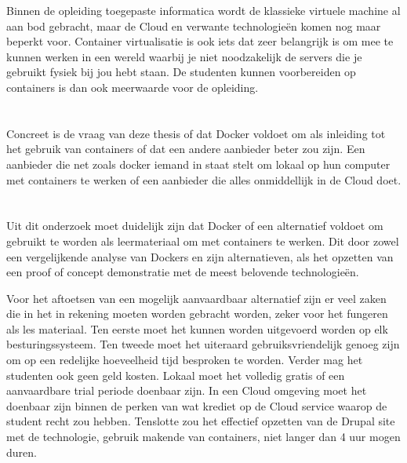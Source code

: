 Binnen de opleiding toegepaste informatica wordt de klassieke virtuele machine al aan bod gebracht, maar de Cloud en verwante technologieën komen nog maar beperkt voor. Container virtualisatie is ook  iets dat zeer belangrijk is om mee te kunnen werken in een wereld waarbij je niet noodzakelijk de servers die je gebruikt fysiek bij jou hebt staan. De studenten kunnen voorbereiden op containers is dan ook meerwaarde voor de opleiding.

\section{}
\label{sec:onderzoeksvraag}

Concreet is de vraag van deze thesis of dat Docker voldoet om als inleiding tot het gebruik van containers of dat een andere aanbieder beter zou zijn. Een aanbieder die net zoals docker iemand in staat stelt om lokaal op hun computer met containers te werken of een aanbieder die alles onmiddellijk  in de Cloud doet.

\section{}
\label{sec:onderzoeksdoelstelling}

Uit dit onderzoek moet duidelijk zijn dat Docker of een alternatief voldoet om gebruikt te worden als leermateriaal om met containers te werken. Dit door zowel een vergelijkende analyse van Dockers en zijn alternatieven, als het opzetten van een proof of concept demonstratie met de meest belovende technologieën.

Voor het aftoetsen van een mogelijk aanvaardbaar alternatief zijn er veel zaken die in het in rekening moeten worden gebracht worden, zeker voor het fungeren als les materiaal. Ten eerste moet het kunnen worden uitgevoerd worden op elk besturingssysteem. Ten tweede moet het uiteraard gebruiksvriendelijk genoeg zijn om op een redelijke hoeveelheid tijd besproken te worden.  Verder mag het studenten ook geen geld kosten. Lokaal moet het volledig gratis of een aanvaardbare trial periode doenbaar zijn. In een Cloud omgeving moet het doenbaar zijn binnen de perken van wat krediet op de Cloud service waarop de student recht zou hebben. Tenslotte zou het effectief opzetten van de Drupal site met de technologie, gebruik makende van containers, niet langer dan 4 uur mogen duren.

